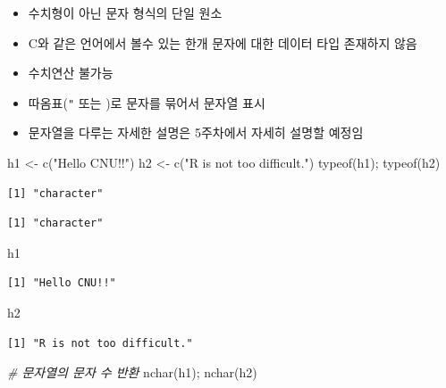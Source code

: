 \documentclass[
  11pt,
]{krantz}
\newenvironment{Shaded}{\begin{snugshade}}{\end{snugshade}}
\newcommand{\CommentTok}[1]{\textcolor[rgb]{0.37,0.37,0.37}{\textit{#1}}}
\newcommand{\FunctionTok}[1]{\textcolor[rgb]{0,0,0}{#1}}
\newcommand{\NormalTok}[1]{#1}
\newcommand{\OtherTok}[1]{\textcolor[rgb]{0.37,0.37,0.37}{#1}}
\newcommand{\StringTok}[1]{\textcolor[rgb]{0.5,0.5,0.5}{#1}}
\providecommand{\tightlist}{%
  \setlength{\itemsep}{0pt}\setlength{\parskip}{0pt}}
\begin{document}
\begin{itemize}
\tightlist
\item
  수치형이 아닌 문자 형식의 단일 원소
\item
  C와 같은 언어에서 볼수 있는 한개 문자에 대한 데이터 타입 존재하지 않음
\item
  수치연산 불가능
\item
  따옴표(\texttt{"} 또는 \texttt{\textquotesingle{}})로 문자를 묶어서 문자열 표시
\item
  문자열을 다루는 자세한 설명은 5주차에서 자세히 설명할 예정임
\end{itemize}

\footnotesize

\begin{Shaded}
\begin{Highlighting}[]
\NormalTok{h1 }\OtherTok{\textless{}{-}} \FunctionTok{c}\NormalTok{(}\StringTok{"Hello CNU!!"}\NormalTok{)}
\NormalTok{h2 }\OtherTok{\textless{}{-}} \FunctionTok{c}\NormalTok{(}\StringTok{"R is not too difficult."}\NormalTok{)}
\FunctionTok{typeof}\NormalTok{(h1); }\FunctionTok{typeof}\NormalTok{(h2)}
\end{Highlighting}
\end{Shaded}

\begin{verbatim}
[1] "character"
\end{verbatim}

\begin{verbatim}
[1] "character"
\end{verbatim}

\begin{Shaded}
\begin{Highlighting}[]
\NormalTok{h1}
\end{Highlighting}
\end{Shaded}

\begin{verbatim}
[1] "Hello CNU!!"
\end{verbatim}

\begin{Shaded}
\begin{Highlighting}[]
\NormalTok{h2}
\end{Highlighting}
\end{Shaded}

\begin{verbatim}
[1] "R is not too difficult."
\end{verbatim}

\begin{Shaded}
\begin{Highlighting}[]
\CommentTok{\# 문자열의 문자 수 반환}
\FunctionTok{nchar}\NormalTok{(h1); }\FunctionTok{nchar}\NormalTok{(h2)}
\end{Highlighting}
\end{Shaded}
\end{document}
